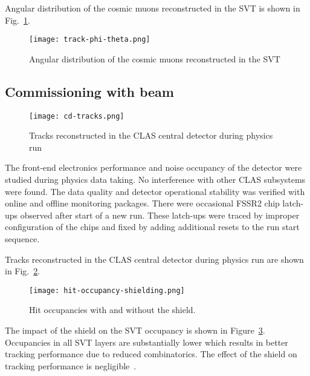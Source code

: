 Angular distribution of the cosmic muons reconstructed in the SVT is shown in Fig.~\ref{fig:track-phi-theta}.

\begin{figure}[hbt] 
\centering 
\texttt{[image: track-phi-theta.png]}
\caption{Angular distribution of the cosmic muons reconstructed in the SVT}
\label{fig:track-phi-theta}
\end{figure}

\subsection{Commissioning with beam}

\begin{figure}[hbt] 
\centering 
\texttt{[image: cd-tracks.png]}
\caption{Tracks reconstructed in the CLAS central detector during physics run}
\label{fig:cd-tracks}
\end{figure}

The front-end electronics performance and noise occupancy of the detector were studied during physics data taking. No interference with other CLAS subsystems were found. The data quality and detector operational stability  was verified with online and offline monitoring packages. There were occasional FSSR2 chip latch-ups observed after start of a new run. These latch-ups were traced by improper configuration of the chips and fixed by adding additional resets to the run start sequence.

Tracks reconstructed in the CLAS central detector during physics run are shown in Fig.~\ref{fig:cd-tracks}. 

\begin{figure}[hbt] 
\centering 
\texttt{[image: hit-occupancy-shielding.png]}
\caption{Hit occupancies with and without the shield.}
\label{fig:hit-occupancy-shielding}
\end{figure}

The impact of the shield on the SVT occupancy is shown in Figure~\ref{fig:hit-occupancy-shielding}. Occupancies in all SVT layers are substantially lower which results in better tracking performance due to reduced combinatorics. The effect of the shield on tracking performance is negligible~\cite{SHIELDNOTE}.


